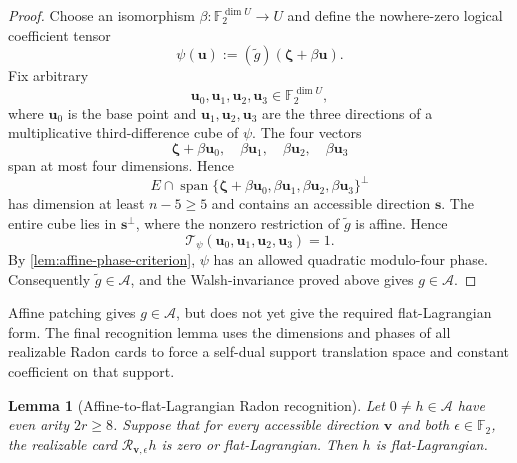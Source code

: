 \documentclass[11pt,letterpaper,onecolumn]{article}
\theoremstyle{plain}
\newtheorem{lemma}[lemma]{Lemma}
\theoremstyle{definition}
\theoremstyle{remark}
\newcommand{\Ftwo}{\mathbb F_2}
\newcommand{\cA}{\mathscr A}
\newcommand{\Span}{\operatorname{span}}
\begin{document}
\begin{proof}
Choose an isomorphism \(\beta:\Ftwo^{\dim U}\to U\) and define the
nowhere-zero logical coefficient tensor
\[
 \psi({\mathbf{u}}):=(\widetilde g)({\boldsymbol{\zeta}}+\beta {\mathbf{u}}).
\]
Fix arbitrary
\[
 {\mathbf{u}}_0,{\mathbf{u}}_1,{\mathbf{u}}_2,{\mathbf{u}}_3\in\Ftwo^{\dim U},
\]
where \({\mathbf{u}}_0\) is the base point and \({\mathbf{u}}_1,{\mathbf{u}}_2,{\mathbf{u}}_3\) are the three
directions of a multiplicative third-difference cube of \(\psi\).  The four
vectors
\[
 {\boldsymbol{\zeta}}+\beta {\mathbf{u}}_0,\quad
 \beta {\mathbf{u}}_1,\quad
 \beta {\mathbf{u}}_2,\quad
 \beta {\mathbf{u}}_3
\]
span at most four dimensions.  Hence
\[
 E\cap
 \Span\{{\boldsymbol{\zeta}}+\beta {\mathbf{u}}_0,\beta {\mathbf{u}}_1,\beta {\mathbf{u}}_2,\beta {\mathbf{u}}_3\}^\perp
\]
has dimension at least \(n-5\ge5\) and contains an accessible direction
\({\mathbf{s}}\).  The entire cube lies in \({\mathbf{s}}^\perp\), where the nonzero restriction
of \(\widetilde g\) is affine. Hence
\[
 \mathcal T_\psi({\mathbf{u}}_0,{\mathbf{u}}_1,{\mathbf{u}}_2,{\mathbf{u}}_3)=1.
\]
By \cref{lem:affine-phase-criterion}, \(\psi\) has an allowed quadratic
modulo-four phase.  Consequently \(\widetilde g\in\cA\), and the
Walsh-invariance proved above gives \(g\in\cA\).
\end{proof}

Affine patching gives \(g\in\cA\), but does not yet give the required
flat-Lagrangian form.  The final recognition lemma uses the dimensions and
phases of all realizable Radon cards to force a self-dual support translation space and
constant coefficient on that support.

\begin{lemma}[Affine-to-flat-Lagrangian Radon recognition]
\label{lem:rm-affine-flat-radon}
Let \(0\ne h\in\cA\) have even arity \(2r\ge8\).  Suppose that for every
accessible direction \({\mathbf{v}}\) and both \(\epsilon\in\Ftwo\), the realizable card
\(\mathcal R_{{\mathbf{v}},\epsilon}h\) is zero or flat-Lagrangian.  Then \(h\) is
flat-Lagrangian.
\end{lemma}
\end{document}
